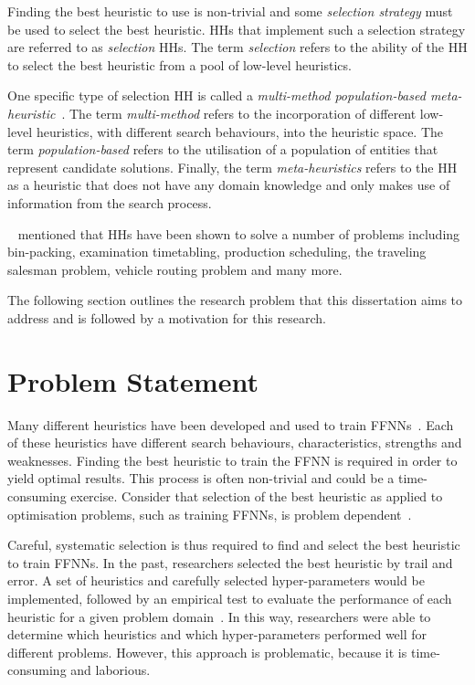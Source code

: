 Finding the best heuristic to use is non-trivial and some \textit{selection strategy} must be used to select the best heuristic. \acp{HH} that implement such a selection strategy are referred to as \textit{selection} \acp{HH}. The term \textit{selection} refers to the ability of the \acs{HH} to select the best heuristic from a pool of low-level heuristics.

One specific type of selection \acs{HH} is called a \textit{multi-method population-based meta-heuristic}~\cite{ref:vanderstockt:2018}. The term \textit{multi-method} refers to the incorporation of different low-level heuristics, with different search behaviours, into the heuristic space. The term \textit{population-based} refers to the utilisation of a population of entities that represent candidate solutions. Finally, the term \textit{meta-heuristics} refers to the \acs{HH} as a heuristic that does not have any domain knowledge and only makes use of information from the search process.

\citeauthor{ref:grobler:2015}~\cite{ref:grobler:2015} mentioned that \acp{HH} have been shown to solve a number of problems including bin-packing, examination timetabling, production scheduling, the traveling salesman problem, vehicle routing problem and many more.

The following section outlines the research problem that this dissertation aims to address and is followed by a motivation for this research.


\section{Problem Statement}\label{sec:introduction:problem}

Many different heuristics have been developed and used to train \acp{FFNN}~\cite{ref:gudise:2003, ref:rakitianskaia:2012, ref:montana:1989}. Each of these heuristics have different search behaviours, characteristics, strengths and weaknesses. Finding the best heuristic to train the \acs{FFNN} is required in order to yield optimal results. This process is often non-trivial and could be a time-consuming exercise.  Consider that selection of the best heuristic as applied to optimisation problems, such as training \acp{FFNN}, is problem dependent~\cite{ref:allen:1996, ref:drake:2020, ref:pillay:2018}.

Careful, systematic selection is thus required to find and select the best heuristic to train \acp{FFNN}. In the past, researchers selected the best heuristic by trail and error. A set of heuristics and carefully selected hyper-parameters would be implemented, followed by an empirical test to evaluate the performance of each heuristic for a given problem domain~\cite{ref:pillay:2015}. In this way, researchers were able to determine which heuristics and which hyper-parameters performed well for different problems. However, this approach is problematic, because it is time-consuming and laborious.


